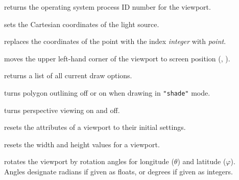 \begin{description}
%
\item[]
returns the operating
system process ID number for the viewport.

%
\item[]
sets the Cartesian
coordinates of the light source.

%
\item[]
replaces the coordinates of the point with
the index {\it integer} with {\it point}.

%
\item[]
moves the upper
left-hand corner of the viewport to screen position
\allowbreak
({\small {}, }).

%
\item[]
returns a list of all current draw options.

%
\item[]
turns polygon outlining
off or on when drawing in {\tt "shade"} mode.

%
\item[]
turns perspective
viewing on and off.

%
\item[]
resets the attributes of a viewport to their
initial settings.

%
\item[]
resets the width and height
values for a viewport.

%
\item[]
rotates the viewport by rotation angles for longitude
({\it $\theta$}) and
latitude ({\it $\varphi$}).
Angles designate radians if given as floats, or degrees if given
as integers.


\end{description}
